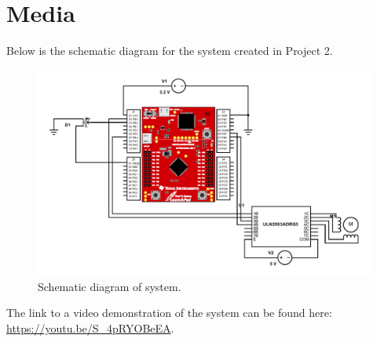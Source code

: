 \documentclass{article}
\begin{document}
\section{Media}
Below is the schematic diagram for the system created in
Project 2.
\begin{figure}[H]
    \centering
    \includegraphics[width=\textwidth]{Images/schemeit-project}
    \caption{Schematic diagram of system.}
    \label{schematic}
\end{figure}

The link to a video demonstration of the system can be found
here: \url{https://youtu.be/S_4pRYOBeEA}.
\end{document}
